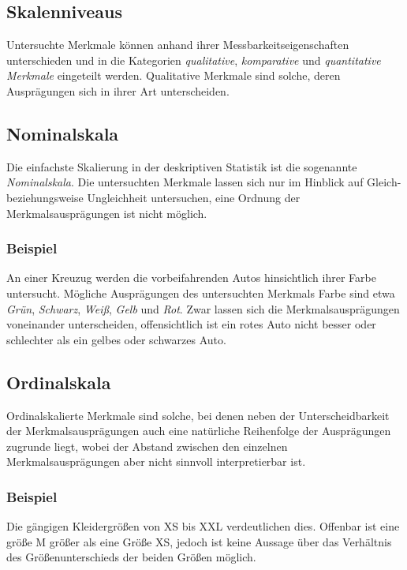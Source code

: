 \documentclass[fontsize=11pt]{scrartcl}
\begin{document}
            \subsection{Skalenniveaus}
                Untersuchte Merkmale können anhand ihrer Messbarkeitseigenschaften unterschieden und in die Kategorien \emph{qualitative}, \emph{komparative} und \emph{quantitative Merkmale} eingeteilt werden.
                Qualitative Merkmale sind solche, deren Ausprägungen sich in ihrer Art unterscheiden. 
                \cite{kohn2005}
            \subsection{Nominalskala}
                Die einfachste Skalierung in der deskriptiven Statistik ist die sogenannte \emph{Nominalskala}. Die untersuchten Merkmale lassen sich nur im Hinblick auf Gleich- beziehungsweise Ungleichheit untersuchen, eine Ordnung der Merkmalsausprägungen ist nicht möglich. 
                \cite{kohn2005}
                \subsubsection{Beispiel}
                    An einer Kreuzug werden die vorbeifahrenden Autos hinsichtlich ihrer Farbe untersucht. Mögliche Ausprägungen des untersuchten Merkmals Farbe sind etwa \emph{Grün}, \emph{Schwarz}, \emph{Weiß}, \emph{Gelb} und \emph{Rot}. Zwar lassen sich die Merkmalsausprägungen voneinander unterscheiden, offensichtlich ist ein rotes Auto nicht besser oder schlechter als ein gelbes oder schwarzes Auto.
                \subsection{Ordinalskala}
                    Ordinalskalierte Merkmale sind solche, bei denen neben der Unterscheidbarkeit der Merkmalsausprägungen auch eine natürliche Reihenfolge der Ausprägungen zugrunde liegt, wobei der Abstand zwischen den einzelnen Merkmalsausprägungen aber nicht sinnvoll interpretierbar ist. \cite{kohn2005}
                    \subsubsection{Beispiel}
                        Die gängigen Kleidergrößen von XS bis XXL verdeutlichen dies. Offenbar ist eine größe M größer als eine Größe XS, jedoch ist keine Aussage über das Verhältnis des Größenunterschieds der beiden Größen möglich.
\end{document}
